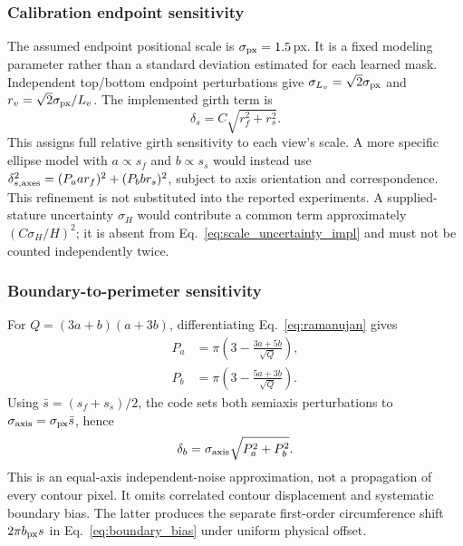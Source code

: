 \documentclass[journal]{IEEEtran}
\begin{document}
\subsubsection{Calibration endpoint sensitivity}
The assumed endpoint positional scale is $\sigma_{\rm px}=1.5$\,px. It is a fixed modeling parameter rather than a standard deviation estimated for each learned mask. Independent top/bottom endpoint perturbations give $\sigma_{L_v}=\sqrt2\sigma_{\rm px}$ and $r_v=\sqrt2\sigma_{\rm px}/L_v$. The implemented girth term is
\begin{equation}
\delta_s=C\sqrt{r_f^2+r_s^2}.
\label{eq:scale_uncertainty_impl}
\end{equation}
This assigns full relative girth sensitivity to each view's scale. A more specific ellipse model with $a\propto s_f$ and $b\propto s_s$ would instead use $\delta_{s,\rm axes}^2=(P_a a r_f)^2+(P_b b r_s)^2$, subject to axis orientation and correspondence. This refinement is not substituted into the reported experiments. A supplied-stature uncertainty $\sigma_H$ would contribute a common term approximately $(C\sigma_H/H)^2$; it is absent from Eq.~\eqref{eq:scale_uncertainty_impl} and must not be counted independently twice.

\subsubsection{Boundary-to-perimeter sensitivity}
For $Q=(3a+b)(a+3b)$, differentiating Eq.~\eqref{eq:ramanujan} gives
\begin{align}
P_a&=\pi\left(3-\frac{3a+5b}{\sqrt Q}\right),\label{eq:ramanujan_partial_a}\\
P_b&=\pi\left(3-\frac{5a+3b}{\sqrt Q}\right).\label{eq:ramanujan_partial_b}
\end{align}
Using $\bar s=(s_f+s_s)/2$, the code sets both semiaxis perturbations to $\sigma_{\rm axis}=\sigma_{\rm px}\bar s$, hence
\begin{equation}
\delta_b=\sigma_{\rm axis}\sqrt{P_a^2+P_b^2}.
\end{equation}
This is an equal-axis independent-noise approximation, not a propagation of every contour pixel. It omits correlated contour displacement and systematic boundary bias. The latter produces the separate first-order circumference shift $2\pi b_{\rm px}s$ in Eq.~\eqref{eq:boundary_bias} under uniform physical offset.
\end{document}
